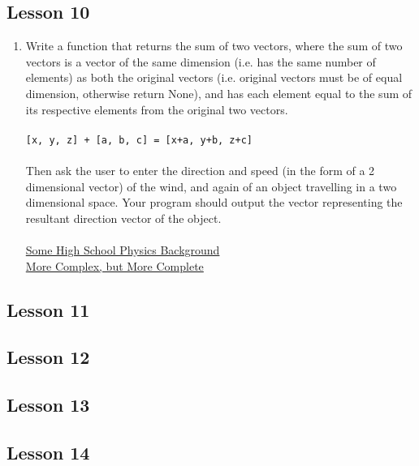 \subsection{Lesson 10}

\begin{enumerate}
	\item       Write a function that returns the sum of two vectors, where the     sum of two vectors is a vector of the same dimension (i.e. has     the same number of elements) as both the original vectors (i.e.     original vectors must be of equal dimension, otherwise return     None), and has each element equal to the sum of its respective     elements from the original two vectors.
\\
\\
\texttt{[x, y, z] + [a, b, c] = [x+a, y+b, z+c]}
\\
\\     Then ask the user to enter the direction and speed (in the form     of a 2 dimensional vector) of the wind, and again of an object     travelling in a two dimensional space. Your program should     output the vector representing the resultant direction vector of     the object.
\\
\\\href{http://www.physicsclassroom.com/Class/vectors/U3L3a.html}{Some High School Physics Background}
\\\href{http://kipper.crk.umn.edu/physics/1012/xtr/vectors.html}{More Complex, but More Complete}
\end{enumerate}

\subsection{Lesson 11}


\subsection{Lesson 12}


\subsection{Lesson 13}


\subsection{Lesson 14}


